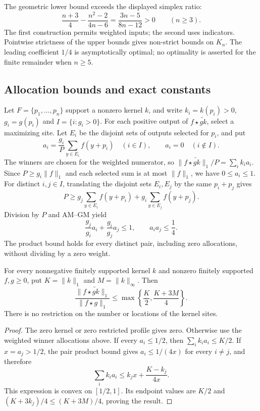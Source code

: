 The geometric lower bound exceeds the displayed simplex ratio:
\[
 \frac{n+3}{4}-\frac{n^2-2}{4n-6}
 =\frac{3n-5}{8n-12}>0\qquad(n\ge3).
\]
The first construction permits weighted inputs; the second uses indicators.
Pointwise strictness of the upper bounds gives non-strict bounds on
$K_n$. The leading coefficient $1/4$ is asymptotically optimal; no
optimality is asserted for the finite remainder when $n\ge5$.

\subsection{Allocation bounds and exact constants}

Let $F=\{p_1,\ldots,p_n\}$ support a nonzero kernel $k$, and write
$k_i=k(p_i)>0$, $g_i=g(p_i)$ and $I=\{i:g_i>0\}$.
For each positive output of $f\star\widetilde{gk}$, select a maximizing
site. Let $E_i$ be the disjoint sets of outputs selected for $p_i$, and put
\[
 a_i=\frac{g_i}{P}\sum_{y\in E_i}f(y+p_i)\quad(i\in I),
 \qquad a_i=0\quad(i\notin I).
\]
The winners are chosen for the weighted numerator, so
$\|f\star\widetilde{gk}\|_1/P=\sum_i k_i a_i$.
Since $P\ge g_i\|f\|_1$ and each selected sum is at most $\|f\|_1$,
we have $0\le a_i\le1$. For distinct $i,j\in I$, translating the
disjoint sets $E_i,E_j$ by the same $p_i+p_j$ gives
\[
 P\ge g_j\sum_{y\in E_i}f(y+p_i)
       +g_i\sum_{y\in E_j}f(y+p_j).
\]
Division by $P$ and AM--GM yield
\begin{equation}\label{five-dual-pairs}
 \frac{g_j}{g_i}a_i+\frac{g_i}{g_j}a_j\le1,\qquad
 a_i a_j\le\frac14.
\end{equation}
The product bound holds for every distinct pair, including zero
allocations, without dividing by a zero weight.

\begin{theorem}\label{thm:weighted-winner}
For every nonnegative finitely supported kernel $k$ and nonzero finitely
supported $f,g\ge0$, put $K=\|k\|_1$ and $M=\|k\|_\infty$. Then
\begin{equation}\label{eq:weighted-winner-bound}
 \frac{\|f\star\widetilde{gk}\|_1}{\|f\star g\|_1}
 \le\max\left\{\frac K2,\frac{K+3M}{4}\right\}.
\end{equation}
There is no restriction on the number or locations of the kernel sites.
\end{theorem}
\begin{proof}
The zero kernel or zero restricted profile gives zero. Otherwise use the
weighted winner allocations above. If every $a_i\le1/2$, then
$\sum_i k_i a_i\le K/2$. If $x=a_j>1/2$, the pair product bound
gives $a_i\le1/(4x)$ for every $i\ne j$, and therefore
\[
 \sum_i k_i a_i\le k_jx+\frac{K-k_j}{4x}.
\]
This expression is convex on $[1/2,1]$. Its endpoint values are
$K/2$ and $(K+3k_j)/4\le(K+3M)/4$, proving the result.
\end{proof}

